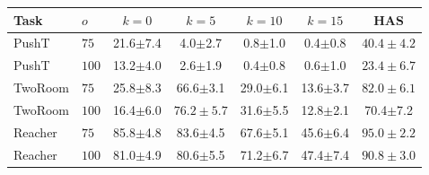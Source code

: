 \begin{tabular}{llccccc}
\toprule
Task & $o$ & $k{=}0$ & $k{=}5$ & $k{=}10$ & $k{=}15$ & HAS \\
\midrule
PushT & $75$ & 21.6$\pm$7.4 & 4.0$\pm$2.7 & 0.8$\pm$1.0 & 0.4$\pm$0.8 & $\mathbf{40.4{\pm}4.2}$ \\
PushT & $100$ & 13.2$\pm$4.0 & 2.6$\pm$1.9 & 0.4$\pm$0.8 & 0.6$\pm$1.0 & $\mathbf{23.4{\pm}6.7}$ \\
\midrule
TwoRoom & $75$ & 25.8$\pm$8.3 & 66.6$\pm$3.1 & 29.0$\pm$6.1 & 13.6$\pm$3.7 & $\mathbf{82.0{\pm}6.1}$ \\
TwoRoom & $100$ & 16.4$\pm$6.0 & $\mathbf{76.2{\pm}5.7}$ & 31.6$\pm$5.5 & 12.8$\pm$2.1 & 70.4$\pm$7.2 \\
\midrule
Reacher & $75$ & 85.8$\pm$4.8 & 83.6$\pm$4.5 & 67.6$\pm$5.1 & 45.6$\pm$6.4 & $\mathbf{95.0{\pm}2.2}$ \\
Reacher & $100$ & 81.0$\pm$4.9 & 80.6$\pm$5.5 & 71.2$\pm$6.7 & 47.4$\pm$7.4 & $\mathbf{90.8{\pm}3.0}$ \\
\bottomrule
\end{tabular}
